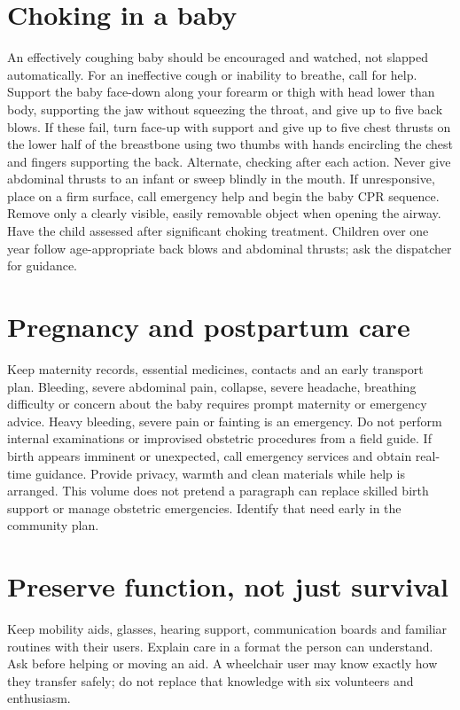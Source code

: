 \documentclass[10pt,openright]{book}
\begin{document}
\section*{Choking in a baby}
An effectively coughing baby should be encouraged and watched, not slapped automatically. For an ineffective cough or inability to breathe, call for help. Support the baby face-down along your forearm or thigh with head lower than body, supporting the jaw without squeezing the throat, and give up to five back blows. If these fail, turn face-up with support and give up to five chest thrusts on the lower half of the breastbone using two thumbs with hands encircling the chest and fingers supporting the back. Alternate, checking after each action. Never give abdominal thrusts to an infant or sweep blindly in the mouth. If unresponsive, place on a firm surface, call emergency help and begin the baby CPR sequence. Remove only a clearly visible, easily removable object when opening the airway. Have the child assessed after significant choking treatment. Children over one year follow age-appropriate back blows and abdominal thrusts; ask the dispatcher for guidance.

\section*{Pregnancy and postpartum care}
Keep maternity records, essential medicines, contacts and an early transport plan. Bleeding, severe abdominal pain, collapse, severe headache, breathing difficulty or concern about the baby requires prompt maternity or emergency advice. Heavy bleeding, severe pain or fainting is an emergency. Do not perform internal examinations or improvised obstetric procedures from a field guide. If birth appears imminent or unexpected, call emergency services and obtain real-time guidance. Provide privacy, warmth and clean materials while help is arranged. This volume does not pretend a paragraph can replace skilled birth support or manage obstetric emergencies. Identify that need early in the community plan.

\section*{Preserve function, not just survival}
Keep mobility aids, glasses, hearing support, communication boards and familiar routines with their users. Explain care in a format the person can understand. Ask before helping or moving an aid. A wheelchair user may know exactly how they transfer safely; do not replace that knowledge with six volunteers and enthusiasm.
\end{document}

